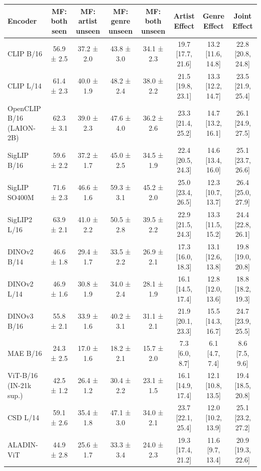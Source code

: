 \begin{tabular}{lccccccc}
\toprule
Encoder & MF: both seen & MF: artist unseen & MF: genre unseen & MF: both unseen & Artist Effect & Genre Effect & Joint Effect \\
\midrule
CLIP B/16 & 56.9 ± 2.5 & 37.2 ± 2.0 & 43.8 ± 3.0 & 34.1 ± 2.3 & 19.7 [17.7, 21.6] & 13.2 [11.6, 14.8] & 22.8 [20.8, 24.8] \\
CLIP L/14 & 61.4 ± 2.3 & 40.0 ± 1.9 & 48.2 ± 2.4 & 38.0 ± 2.2 & 21.5 [19.8, 23.1] & 13.3 [12.2, 14.7] & 23.5 [21.9, 25.4] \\
OpenCLIP B/16 (LAION-2B) & 62.3 ± 3.1 & 39.0 ± 2.3 & 47.6 ± 4.0 & 36.2 ± 2.6 & 23.3 [21.4, 25.2] & 14.7 [13.2, 16.1] & 26.1 [24.9, 27.5] \\
SigLIP B/16 & 59.6 ± 2.2 & 37.2 ± 1.7 & 45.0 ± 2.5 & 34.5 ± 1.9 & 22.4 [20.5, 24.3] & 14.6 [13.4, 16.0] & 25.1 [23.7, 26.6] \\
SigLIP SO400M & 71.6 ± 2.3 & 46.6 ± 1.6 & 59.3 ± 3.1 & 45.2 ± 2.0 & 25.0 [23.4, 26.5] & 12.3 [10.7, 13.7] & 26.4 [25.0, 27.9] \\
SigLIP2 L/16 & 63.9 ± 2.1 & 41.0 ± 2.2 & 50.5 ± 2.8 & 39.5 ± 2.2 & 22.9 [21.5, 24.3] & 13.3 [11.5, 15.2] & 24.4 [22.8, 26.1] \\
DINOv2 B/14 & 46.6 ± 1.8 & 29.4 ± 1.7 & 33.5 ± 2.2 & 26.9 ± 2.1 & 17.3 [16.0, 18.3] & 13.1 [12.6, 13.8] & 19.8 [19.0, 20.8] \\
DINOv2 L/14 & 46.9 ± 1.6 & 30.8 ± 1.9 & 34.0 ± 2.4 & 28.1 ± 1.9 & 16.1 [14.5, 17.4] & 12.8 [12.0, 13.6] & 18.8 [18.2, 19.3] \\
DINOv3 B/16 & 55.8 ± 2.1 & 33.9 ± 1.6 & 40.2 ± 3.1 & 31.1 ± 2.1 & 21.9 [20.1, 23.3] & 15.5 [14.3, 16.7] & 24.7 [23.9, 25.5] \\
MAE B/16 & 24.3 ± 2.5 & 17.0 ± 1.6 & 18.2 ± 2.1 & 15.7 ± 2.0 & 7.3 [6.0, 8.7] & 6.1 [4.7, 7.4] & 8.6 [7.5, 9.6] \\
ViT-B/16 (IN-21k sup.) & 42.5 ± 1.2 & 26.4 ± 1.2 & 30.4 ± 2.2 & 23.1 ± 1.5 & 16.1 [14.9, 17.4] & 12.1 [10.8, 13.5] & 19.4 [18.5, 20.8] \\
CSD L/14 & 59.1 ± 2.6 & 35.4 ± 1.8 & 47.1 ± 3.0 & 34.0 ± 2.1 & 23.7 [22.1, 25.4] & 12.0 [10.2, 13.9] & 25.1 [23.2, 27.2] \\
ALADIN-ViT & 44.9 ± 2.8 & 25.6 ± 1.7 & 33.3 ± 3.4 & 24.0 ± 2.3 & 19.3 [17.4, 21.2] & 11.6 [9.7, 13.4] & 20.9 [19.3, 22.6] \\
\bottomrule
\end{tabular}
